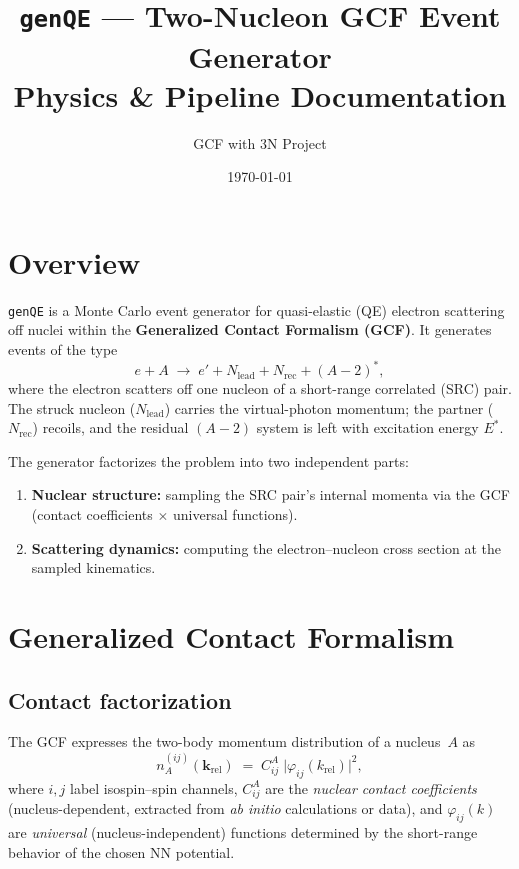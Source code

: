 \documentclass[11pt,a4paper]{article}
\title{\texttt{genQE} --- Two-Nucleon GCF Event Generator\\[4pt]
       \large Physics \& Pipeline Documentation}
\author{GCF with 3N Project}
\date{\today}
\newcommand{\vect}[1]{\bm{#1}}
\begin{document}
\maketitle
\tableofcontents
\newpage

\section{Overview}

\texttt{genQE} is a Monte Carlo event generator for quasi-elastic (QE) electron
scattering off nuclei within the \textbf{Generalized Contact Formalism (GCF)}.
It generates events of the type
\begin{equation}
  e + A \;\longrightarrow\; e' + N_{\text{lead}} + N_{\text{rec}} + (A{-}2)^{*},
\end{equation}
where the electron scatters off one nucleon of a short-range correlated (SRC)
pair.  The struck nucleon ($N_{\text{lead}}$) carries the virtual-photon
momentum; the partner ($N_{\text{rec}}$) recoils, and the residual $(A{-}2)$
system is left with excitation energy $E^{*}$.

The generator factorizes the problem into two independent parts:
\begin{enumerate}
  \item \textbf{Nuclear structure:} sampling the SRC pair's internal momenta
        via the GCF (contact coefficients $\times$ universal functions).
  \item \textbf{Scattering dynamics:} computing the electron--nucleon cross
        section at the sampled kinematics.
\end{enumerate}

\section{Generalized Contact Formalism}

\subsection{Contact factorization}

The GCF expresses the two-body momentum distribution of a nucleus~$A$ as
\begin{equation}\label{eq:gcf}
  n_A^{(ij)}(\vect{k}_{\text{rel}})
  \;=\; C_{ij}^{A}\;\bigl|\varphi_{ij}(k_{\text{rel}})\bigr|^{2},
\end{equation}
where $i,j$ label isospin--spin channels, $C_{ij}^{A}$ are the
\emph{nuclear contact coefficients} (nucleus-dependent, extracted from
\textit{ab initio} calculations or data), and $\varphi_{ij}(k)$ are
\emph{universal} (nucleus-independent) functions determined by the
short-range behavior of the chosen NN potential.
\end{document}
